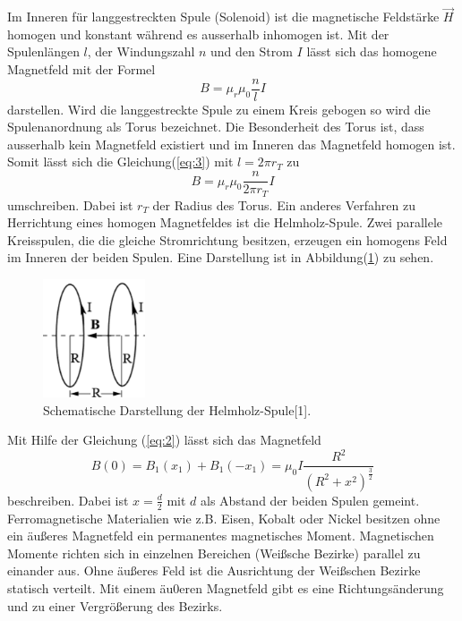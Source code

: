Im Inneren für langgestreckten Spule (Solenoid) ist die magnetische Feldstärke $\vec{H}$
homogen und konstant während es ausserhalb inhomogen ist.
Mit der Spulenlängen $l$, der Windungszahl $n$ und den Strom $I$ lässt sich das
homogene Magnetfeld mit der Formel
\begin{equation}
  B = \mu_r \mu_0 \frac{n}{l} I
  \label{eq:3}
\end{equation}
darstellen. Wird die langgestreckte Spule zu einem Kreis gebogen so wird die Spulenanordnung
als Torus bezeichnet. Die Besonderheit des Torus ist, dass ausserhalb kein Magnetfeld
existiert und im Inneren das Magnetfeld homogen ist. Somit lässt sich die Gleichung(\ref{eq:3})
mit $l= 2\pi r_T$ zu
\begin{equation}
  B = \mu_r \mu_0 \frac{n}{2\pi r_T} I
  \label{eq:4}
\end{equation}
umschreiben. Dabei ist $r_T$ der Radius des Torus.
Ein anderes Verfahren zu Herrichtung eines homogen Magnetfeldes ist die Helmholz-Spule.
Zwei parallele Kreisspulen, die die gleiche Stromrichtung besitzen, erzeugen ein homogens
Feld im Inneren der beiden Spulen. Eine Darstellung ist in Abbildung(\ref{abb:2}) zu sehen.
\begin{figure}[H]
  \centering
\includegraphics[width =5 cm, height = 3.5cm]{Abb2.png}
\caption{Schematische Darstellung der Helmholz-Spule[1].}
\label{abb:2}
\end{figure}
Mit Hilfe der Gleichung (\ref{eq:2}) lässt sich das Magnetfeld
\begin{equation}
  B(0)=B_1(x_1) + B_1(-x_1) = \mu_0 I \frac{R^2}{(R^2 + x^2)^{\frac{3}{2}}}
  \label{eq:5}
\end{equation}
beschreiben. Dabei ist $x=\frac{d}{2}$ mit $d$ als Abstand der beiden Spulen gemeint.\\
Ferromagnetische Materialien wie z.B. Eisen, Kobalt oder Nickel besitzen ohne ein äußeres Magnetfeld
ein permanentes magnetisches Moment. Magnetischen Momente richten sich in einzelnen Bereichen (Weißsche Bezirke)
parallel zu einander aus. Ohne äußeres Feld ist die Ausrichtung der Weißschen Bezirke statisch verteilt.
Mit einem äu0eren Magnetfeld gibt es eine Richtungsänderung und zu einer Vergrößerung des Bezirks.
